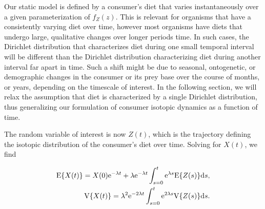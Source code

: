 \documentclass{frontiersSCNS}
\begin{document}






Our static model is defined by a consumer's diet that varies instantaneously over a given parameterization of $f_Z(z)$.
This is relevant for organisms that have a consistently varying diet over time, however most organisms have diets that undergo large, qualitative changes over longer periods time.
In such cases, the Dirichlet distribution that characterizes diet during one small temporal interval will be different than the Dirichlet distribution characterizing diet during another interval far apart in time.
Such a shift might be due to seasonal, ontogenetic, or demographic changes in the consumer or its prey base over the course of months, or years, depending on the timescale of interest.
In the following section, we will relax the assumption that diet is characterized by a single Dirichlet distribution, thus generalizing our formulation of consumer isotopic dynamics as a function of time.

The random variable of interest is now $Z(t)$, which is the trajectory defining the isotopic distribution of the consumer's diet over time.
Solving for $X(t)$, we find

\begin{align}
  \label{eqEVarZt}
{\rm E}\{X(t)\} = X(0){\rm e}^{-\lambda t} + \lambda{\rm e}^{-\lambda t} \int_{s=0}^t {\rm e}^{\lambda s} {\rm E}\{Z(s)\}{\rm d}s, \nonumber \\
{\rm V}\{X(t)\} = \lambda^2 {\rm e}^{-2\lambda t} \int_{s=0}^t {\rm e}^{2\lambda s} {\rm V}\{Z(s)\} {\rm d}s.
\end{align}
\end{document}

